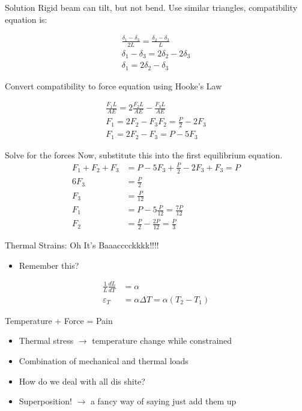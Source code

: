 \documentclass[10pt, svgnames]{beamer}
\begin{document}
\begin{frame}[label={sec:orgb392a7d}]{Solution}
Rigid beam can tilt, but not bend. Use similar triangles, compatibility equation is:

\begin{align*}
    \frac{\delta_1 - \delta_3}{2L} = \frac{\delta_2 - \delta_3}{L} \\
    \delta_1 - \delta_3 = 2\delta_2 - 2\delta_3 \\
    \delta_1 = 2\delta_2 - \delta_3
\end{align*}

Convert compatibility to force equation using Hooke's Law

\begin{gather*}
    \frac{F_1 L}{AE} = 2\frac{F_2 L}{AE} - \frac{F_3 L}{AE} \\
    F_1 = 2F_2 - F_3
    F_2 = \frac{P}{2} - 2F_3 \\
    F_1 = 2F_2 - F_3 = P - 5F_3
\end{gather*}
\end{frame}

\begin{frame}[label={sec:org43e6a26}]{Solve for the forces}
Now, substitute this into the first equilibrium equation.
\begin{align*}
   F_1 + F_2 + F_3 &= P - 5F_3 + \frac{P}{2} - 2F_3 + F_3 = P \\
   6F_3 &= \frac{P}{2} \\
   F_3 &= \frac{P}{12} \\
   F_1 &= P - 5 \frac{P}{12} = \frac{7P}{12} \\
   F_2 &= \frac{P}{2} - \frac{2P}{12} = \frac{P}{3}
\end{align*}
\end{frame}

\begin{frame}[label={sec:org4d4dcd5}]{Thermal Strains: Oh It's Baaacccckkkk!!!!}
\begin{itemize}
\item Remember this?
\end{itemize}

\begin{align*}
  \frac{1}{L}\frac{dL}{dT} &= \alpha \\
  \varepsilon_T &= \alpha \Delta T = \alpha \left( T_2 - T_1 \right)
\end{align*}
\end{frame}

\begin{frame}[label={sec:orgd041460}]{Temperature + Force = Pain}
\begin{itemize}
\item Thermal stress \(\rightarrow\) temperature change while constrained

\item Combination of mechanical and thermal loads

\item How do we deal with all dis shite?

\item Superposition! \(\rightarrow\) a fancy way of saying just add them up
\end{itemize}
\end{frame}
\end{document}
